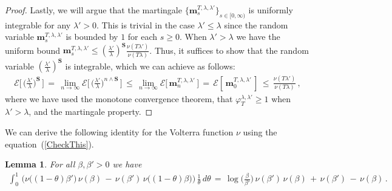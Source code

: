 \documentclass[10pt]{article}
\numberwithin{equation}{section}
\newtheorem{lemma}[theorem]{Lemma}
\theoremstyle{definition}
\begin{document}
\begin{proof}
 Lastly, we will argue that the martingale $\{\mathbf{m}_s^{T,\lambda,\lambda'}\}_{s\in [0,\infty)} $ is uniformly integrable for any $\lambda'>0$. This is trivial in the case $\lambda'\leq \lambda$ since the random variable $\mathbf{m}_s^{T,\lambda,\lambda'}$ is bounded by $1$ for each $s\geq 0$. When $\lambda'> \lambda$ we have the uniform bound
 $  \mathbf{m}_s^{T,\lambda,\lambda'} \leq   (\frac{\lambda'}{\lambda})^{ \mathbf{S}} \frac{\nu(T\lambda')   }{\nu(T\lambda)}$.   Thus, it suffices to show that the random variable $(\frac{\lambda'}{\lambda})^{ \mathbf{S}} $ is integrable, which we  can  achieve as follows:
\begin{align*}
  \mathcal{E}\Bigg[ \, \bigg(\frac{\lambda'}{\lambda}\bigg)^{ \mathbf{S}} \,\Bigg]  \,=\,\lim_{n\rightarrow \infty} \mathcal{E}\Bigg[ \, \bigg(\frac{\lambda'}{\lambda}\bigg)^{n\wedge \mathbf{S}}\, \Bigg] \,\leq \, \lim_{n\rightarrow \infty} \mathcal{E}\Big[ \,\mathbf{m}_n^{T,\lambda,\lambda'} \, \Big]\,=\, \mathcal{E}\left[  \,\mathbf{m}_0^{T,\lambda,\lambda'} \,\right]\,\leq \, \frac{\nu(T\lambda')   }{\nu(T\lambda)} \,,
\end{align*}
where we have used the monotone convergence theorem,   that $\varphi_T^{\lambda,\lambda'}\geq 1$ when $\lambda'>\lambda$, and the martingale property.
\end{proof}

We can derive the following  identity for the Volterra function $\nu$ using the equation~(\ref{CheckThis}).
\begin{lemma}\label{LemmaC}   For all   $\beta,\beta' >  0$ we have
\begin{align*}
     \int_{0}^1  \,\Big(  \nu\big((1-\theta)\beta' \big)\,  \nu(\beta)   \,-\, \nu(\beta') \,\nu\big((1-\theta)\beta\big)      \Big)\, \frac{1}{\theta }\, d\theta  \,=\,  \log \Big(\frac{\beta}{\beta'}\Big)\,  \nu(\beta')\,    \nu(\beta)     \,+\, \nu(\beta')   \,-\, \nu(\beta) \,.
\end{align*}
\end{lemma}
\end{document}
